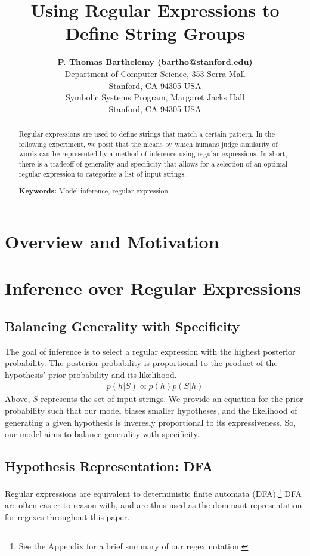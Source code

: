 \documentclass[10pt,letterpaper]{article}
\title{Using Regular Expressions to Define String Groups}
\author{{\large \bf{P. Thomas Barthelemy} (bartho@stanford.edu)} \\
  Department of Computer Science, 353 Serra Mall \\
  Stanford, CA 94305 USA
  \AND {\large \bf Nicholas Borg (nickborg@stanford.edu)} \\
  Symbolic Systems Program, Margaret Jacks Hall \\
  Stanford, CA 94305 USA}
\begin{document}
\maketitle


\begin{abstract}
Regular expressions are used to define strings that match a certain pattern. In the following experiment, we posit that the means by which humans judge similarity of words can be represented by a method of inference using regular expressions. In short, there is a tradeoff of generality and specificity that allows for a selection of an optimal regular expression to categorize a list of input strings.

\textbf{Keywords:} 
Model inference, regular expression.
\end{abstract}


\section{Overview and Motivation}

\section{Inference over Regular Expressions}

\subsection{Balancing Generality with Specificity}
The goal of inference is to select a regular expression with the highest posterior probability. The posterior probability is proportional to the product of the hypothesis' prior probability and its likelihood.
\begin{align*}
	p(h|S) \propto p(h) p(S|h)
\end{align*}
Above, $S$ represents the set of input strings. We provide an equation for the prior probability such that our model biases smaller hypotheses, and the likelihood of generating a given hypothesis is inveresly proportional to its expressiveness. So, our model aims to balance generality with specificity.

\subsection{Hypothesis Representation: DFA}
Regular expressions are equivalent to deterministic finite automata (DFA).\footnote{See the Appendix for a brief summary of our regex notation.} DFA are often easier to reason with, and are thus used as the dominant representation for regexes throughout this paper.
\end{document}
